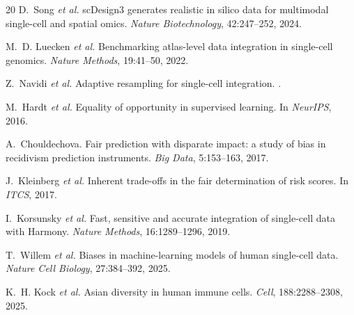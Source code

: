 \documentclass[sigconf]{acmart}
\begin{document}
\begin{thebibliography}{20}
D.~Song \textit{et al.}
\newblock scDesign3 generates realistic in silico data for multimodal single-cell and spatial omics.
\newblock \textit{Nature Biotechnology}, 42:247--252, 2024.

M.~D. Luecken \textit{et al.}
\newblock Benchmarking atlas-level data integration in single-cell genomics.
\newblock \textit{Nature Methods}, 19:41--50, 2022.

Z.~Navidi \textit{et al.}
\newblock Adaptive resampling for single-cell integration.
.

M.~Hardt \textit{et al.}
\newblock Equality of opportunity in supervised learning.
\newblock In \textit{NeurIPS}, 2016.

A.~Chouldechova.
\newblock Fair prediction with disparate impact: a study of bias in recidivism prediction instruments.
\newblock \textit{Big Data}, 5:153--163, 2017.

J.~Kleinberg \textit{et al.}
\newblock Inherent trade-offs in the fair determination of risk scores.
\newblock In \textit{ITCS}, 2017.

I.~Korsunsky \textit{et al.}
\newblock Fast, sensitive and accurate integration of single-cell data with Harmony.
\newblock \textit{Nature Methods}, 16:1289--1296, 2019.

T.~Willem \textit{et al.}
\newblock Biases in machine-learning models of human single-cell data.
\newblock \textit{Nature Cell Biology}, 27:384--392, 2025.

K.~H. Kock \textit{et al.}
\newblock Asian diversity in human immune cells.
\newblock \textit{Cell}, 188:2288--2308, 2025.

\end{thebibliography}
\end{document}
